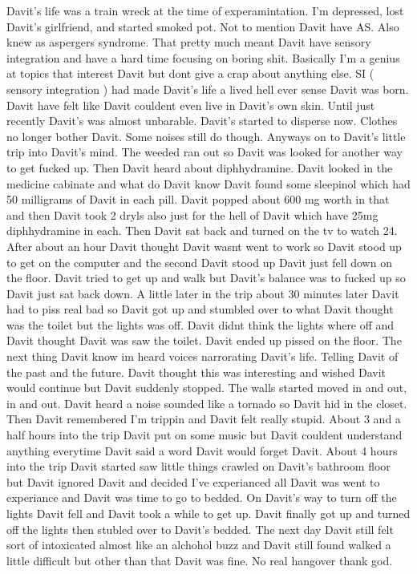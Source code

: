 \documentclass[12pt]{book}
\begin{document}
Davit's life was a train wreck at the time of experamintation. I'm depressed, lost Davit's girlfriend, and started smoked pot. Not to mention Davit have AS. Also knew as aspergers syndrome. That pretty much meant Davit have sensory integration and have a hard time focusing on boring shit. Basically I'm a genius at topics that interest Davit but dont give a crap about anything else. SI ( sensory integration ) had made Davit's life a lived hell ever sense Davit was born. Davit have felt like Davit couldent even live in Davit's own skin. Until just recently Davit's was almost unbarable. Davit's started to disperse now. Clothes no longer bother Davit. Some noises still do though. Anyways on to Davit's little trip into Davit's mind. The weeded ran out so Davit was looked for another way to get fucked up. Then Davit heard about diphhydramine. Davit looked in the medicine cabinate and what do Davit know Davit found some sleepinol which had 50 milligrams of Davit in each pill. Davit popped about 600 mg worth in that and then Davit took 2 dryls also just for the hell of Davit which have 25mg diphhydramine in each. Then Davit sat back and turned on the tv to watch 24. After about an hour Davit thought Davit wasnt went to work so Davit stood up to get on the computer and the second Davit stood up Davit just fell down on the floor. Davit tried to get up and walk but Davit's balance was to fucked up so Davit just sat back down. A little later in the trip about 30 minutes later Davit had to piss real bad so Davit got up and stumbled over to what Davit thought was the toilet but the lights was off. Davit didnt think the lights where off and Davit thought Davit was saw the toilet. Davit ended up pissed on the floor. The next thing Davit know im heard voices narrorating Davit's life. Telling Davit of the past and the future. Davit thought this was interesting and wished Davit would continue but Davit suddenly stopped. The walls started moved in and out, in and out. Davit heard a noise sounded like a tornado so Davit hid in the closet. Then Davit remembered I'm trippin and Davit felt really stupid. About 3 and a half hours into the trip Davit put on some music but Davit couldent understand anything everytime Davit said a word Davit would forget Davit. About 4 hours into the trip Davit started saw little things crawled on Davit's bathroom floor but Davit ignored Davit and decided I've experianced all Davit was went to experiance and Davit was time to go to bedded. On Davit's way to turn off the lights Davit fell and Davit took a while to get up. Davit finally got up and turned off the lights then stubled over to Davit's bedded. The next day Davit still felt sort of intoxicated almost like an alchohol buzz and Davit still found walked a little difficult but other than that Davit was fine. No real hangover thank god.
\end{document}
